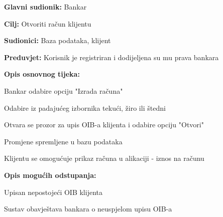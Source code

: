         
                
               \noindent {}
                \begin{packed_item}
            
                  \item \textbf{Glavni sudionik: }Bankar
                  \item  \textbf{Cilj:} Otvoriti račun klijentu
                  \item  \textbf{Sudionici:} Baza podataka, klijent
                  \item  \textbf{Preduvjet:} Korisnik je registriran i dodijeljena su mu prava bankara
                  \item  \textbf{Opis osnovnog tijeka:}
                  
                  \item[] \begin{packed_enum}
                
                    \item Bankar odabire opciju "Izrada računa" 
                    \item Odabire iz padajućeg izbornika tekući, žiro ili štedni
                    \item Otvara se prozor za upis OIB-a klijenta i odabire opciju "Otvori"
                    \item Promjene spremljene u bazu podataka                 
                    \item Klijentu se omogućuje prikaz računa u alikaciji - iznos na računu
                   \end{packed_enum}
                  
                  \item  \textbf{Opis mogućih odstupanja:}
                  
                  \item[] \begin{packed_item}
                
                    \item[3.a] Upisan nepostojeći OIB klijenta
                    \item[] \begin{packed_enum}
                      
                      \item Sustav obavještava bankara o neuspjelom upisu OIB-a 
                      
                    \end{packed_enum}
                    
                  \end{packed_item}
                \end{packed_item}
                
